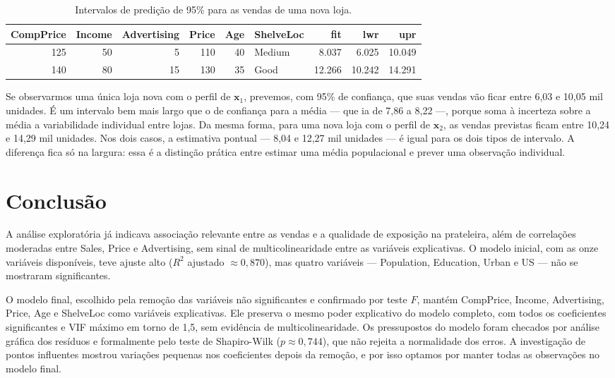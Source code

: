 \documentclass[a4paper]{modeloUFCG} %
\begin{document}
\begin{table}

\caption{\label{tab:previsaoPredicao}Intervalos de predição de 95\% para as vendas de uma nova loja.}
\centering
\begin{tabular}[t]{r|r|r|r|r|l|r|r|r}
\hline
CompPrice & Income & Advertising & Price & Age & ShelveLoc & fit & lwr & upr\\
\hline
125 & 50 & 5 & 110 & 40 & Medium & 8.037 & 6.025 & 10.049\\
\hline
140 & 80 & 15 & 130 & 35 & Good & 12.266 & 10.242 & 14.291\\
\hline
\end{tabular}
\end{table}

Se observarmos uma única loja nova com o perfil de \(\mathbf{x}_1\), prevemos, com 95\% de confiança, que suas vendas vão ficar entre 6,03 e 10,05 mil unidades. É um intervalo bem mais largo que o de confiança para a média --- que ia de 7,86 a 8,22 ---, porque soma à incerteza sobre a média a variabilidade individual entre lojas. Da mesma forma, para uma nova loja com o perfil de \(\mathbf{x}_2\), as vendas previstas ficam entre 10,24 e 14,29 mil unidades. Nos dois casos, a estimativa pontual --- 8,04 e 12,27 mil unidades --- é igual para os dois tipos de intervalo. A diferença fica só na largura: essa é a distinção prática entre estimar uma média populacional e prever uma observação individual.

\section{Conclusão}\label{conclusuxe3o}

A análise exploratória já indicava associação relevante entre as vendas e a qualidade de exposição na prateleira, além de correlações moderadas entre Sales, Price e Advertising, sem sinal de multicolinearidade entre as variáveis explicativas. O modelo inicial, com as onze variáveis disponíveis, teve ajuste alto (\(R^2\) ajustado \(\approx 0{,}870\)), mas quatro variáveis --- Population, Education, Urban e US --- não se mostraram significantes.

O modelo final, escolhido pela remoção das variáveis não significantes e confirmado por teste \(F\), mantém CompPrice, Income, Advertising, Price, Age e ShelveLoc como variáveis explicativas. Ele preserva o mesmo poder explicativo do modelo completo, com todos os coeficientes significantes e VIF máximo em torno de 1,5, sem evidência de multicolinearidade. Os pressupostos do modelo foram checados por análise gráfica dos resíduos e formalmente pelo teste de Shapiro-Wilk (\(p \approx 0{,}744\)), que não rejeita a normalidade dos erros. A investigação de pontos influentes mostrou variações pequenas nos coeficientes depois da remoção, e por isso optamos por manter todas as observações no modelo final.
\end{document}
